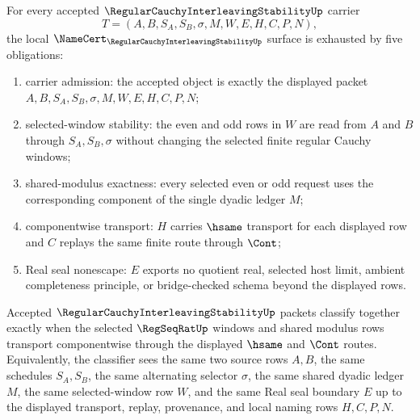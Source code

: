 \begin{theorem}
\label{thm:regular-cauchy-interleaving-stability-obligations}
For every accepted $\RegularCauchyInterleavingStabilityUp$ carrier
$$
T=(A,B,S_A,S_B,\sigma,M,W,E,H,C,P,N),
$$
the local $\NameCert_{\RegularCauchyInterleavingStabilityUp}$ surface is exhausted by five obligations:
\begin{enumerate}
\item carrier admission: the accepted object is exactly the displayed packet $A,B,S_A,S_B,\sigma,M,W,E,H,C,P,N$;
\item selected-window stability: the even and odd rows in $W$ are read from $A$ and $B$ through $S_A,S_B,\sigma$ without changing the selected finite regular Cauchy windows;
\item shared-modulus exactness: every selected even or odd request uses the corresponding component of the single dyadic ledger $M$;
\item componentwise transport: $H$ carries $\hsame$ transport for each displayed row and $C$ replays the same finite route through $\Cont$;
\item Real seal nonescape: $E$ exports no quotient real, selected host limit, ambient completeness principle, or bridge-checked schema beyond the displayed rows.
\end{enumerate}
\end{theorem}

\begin{theorem}
\label{thm:regular-cauchy-interleaving-stability-classifier}
Accepted $\RegularCauchyInterleavingStabilityUp$ packets classify together exactly when the selected $\RegSeqRatUp$ windows and shared modulus rows transport componentwise through the displayed $\hsame$ and $\Cont$ routes. Equivalently, the classifier sees the same two source rows $A,B$, the same schedules $S_A,S_B$, the same alternating selector $\sigma$, the same shared dyadic ledger $M$, the same selected-window row $W$, and the same Real seal boundary $E$ up to the displayed transport, replay, provenance, and local naming rows $H,C,P,N$.
\end{theorem}



